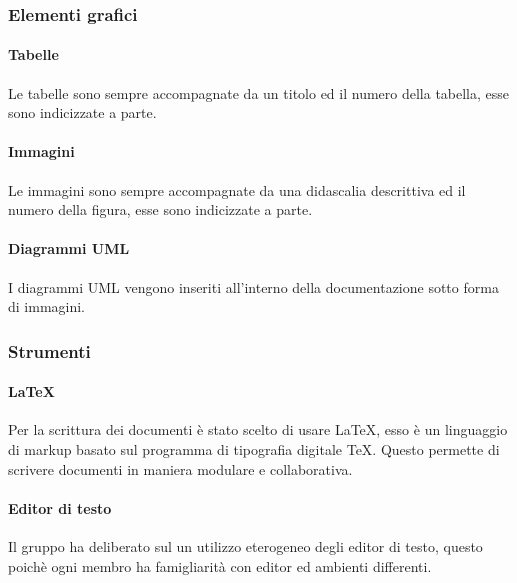 		\subsubsection{Elementi grafici}
			\paragraph{Tabelle}
				Le tabelle sono sempre accompagnate da un titolo ed il numero della tabella, esse sono indicizzate a parte.
			\paragraph{Immagini}
				Le immagini sono sempre accompagnate da una didascalia descrittiva ed il numero della figura, esse sono indicizzate a parte.
			\paragraph{Diagrammi UML}
				I diagrammi UML vengono inseriti all'interno della documentazione sotto forma di immagini.
		\subsubsection{Strumenti}
			\paragraph{LaTeX}
				Per la scrittura dei documenti è stato scelto di usare \LaTeX{}, esso è un linguaggio di markup basato sul programma di tipografia digitale \TeX{}. Questo permette di scrivere documenti in maniera modulare e collaborativa.
			\paragraph{Editor di testo}
				Il gruppo ha deliberato sul un utilizzo eterogeneo degli editor di testo, questo poichè ogni membro ha famigliarità con editor ed ambienti differenti.
